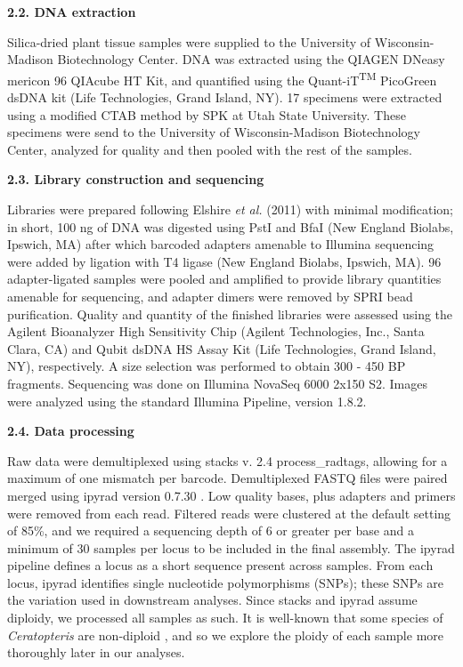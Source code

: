 \documentclass[12pt]{article}
\begin{document}
\begin{flushleft}
\textbf{2.2. DNA extraction}

Silica-dried plant tissue samples were supplied to the University of Wisconsin-Madison Biotechnology Center. DNA was extracted using the QIAGEN DNeasy mericon 96 QIAcube HT Kit, and quantified using the Quant-iT\textsuperscript{TM} PicoGreen\textsuperscript{\textregistered} dsDNA kit (Life Technologies, Grand Island, NY). 17 specimens were extracted using a modified CTAB method \autocite{Doyle1987} by SPK at Utah State University. These specimens were send to the University of Wisconsin-Madison Biotechnology Center, analyzed for quality and then pooled with the rest of the samples.

\textbf{2.3. Library construction and sequencing}

Libraries were prepared following Elshire \textit{et al.} (2011)\nocite{Elshire2011} with minimal modification; in short, 100 ng of DNA was digested using PstI and BfaI (New England Biolabs, Ipswich, MA) after which barcoded adapters amenable to Illumina sequencing were added by ligation with T4 ligase (New England Biolabs, Ipswich, MA). 96 adapter-ligated samples were pooled and amplified to provide library quantities amenable for sequencing, and adapter dimers were removed by SPRI bead purification. Quality and quantity of the finished libraries were assessed using the Agilent Bioanalyzer High Sensitivity Chip (Agilent Technologies, Inc., Santa Clara, CA) and Qubit\textsuperscript{\textregistered} dsDNA HS Assay Kit (Life Technologies, Grand Island, NY), respectively. A size selection was performed to obtain 300 - 450 BP fragments. Sequencing was done on Illumina NovaSeq 6000 2x150 S2. Images were analyzed using the standard Illumina Pipeline, version 1.8.2. 

\textbf{2.4. Data processing}

Raw data were demultiplexed using stacks v. 2.4 \autocite{Catchen2011, Catchen2013} process\_radtags, allowing for a maximum of one mismatch per barcode. Demultiplexed FASTQ files were paired merged using ipyrad version 0.7.30 \autocite{Eaton2020}. Low quality bases, plus adapters and primers were removed from each read. Filtered reads were clustered at the default setting of 85\%, and we required a sequencing depth of 6 or greater per base and a minimum of 30 samples per locus to be included in the final assembly. The ipyrad pipeline defines a locus as a short sequence present across samples. From each locus, ipyrad identifies single nucleotide polymorphisms (SNPs); these SNPs are the variation used in downstream analyses. Since stacks and ipyrad assume diploidy, we processed all samples as such. It is well-known that some species of \textit{Ceratopteris} are non-diploid \autocite{Adjie2007, Masuyama2010}, and so we explore the ploidy of each sample more thoroughly later in our analyses.


\end{flushleft}
\end{document}
